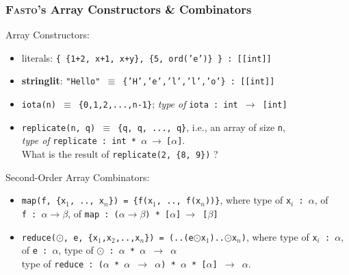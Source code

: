 \documentclass{beamer}
\renewcommand{\emph}[1]{\textcolor{structure}{#1}}
\newcommand{\emp}[1]{\textcolor{DikuRed}{ #1}}
\begin{document}
\begin{frame}[fragile,t]
\frametitle{\textsc{Fasto}'s Array Constructors \& Combinators}

Array Constructors:
\begin{itemize}
    \item literals: \emph{{\tt \{~\{1+2, x+1, x+y\}, \{5, ord('e')\}~\}}}\emp{{\tt~:~[[int]]}}
    \item {\bf stringlit}: \emph{{\tt "Hello"~$\equiv$~\{'H','e','l','l','o'\}}}\emp{{\tt~:~[[int]]}}\pause
    \item {\tt iota(n)~$\equiv$}~\emph{{\tt\{0,1,2,...,n-1\}}}; {\em type of} 
        \emp{{\tt iota~:~int~$\rightarrow$~[int]}}\pause
    \item {\tt replicate(n, q)~$\equiv$}~\emph{{\tt\{q, q, ..., q\}}}, i.e., an array of size {\tt n},\\
          {\em type of} \emp{{\tt{}replicate : int * $\alpha~\rightarrow~$[$\alpha$]}}.\\
        What is the result of {\tt replicate(2, \{8, 9\})} ?
\end{itemize}

\pause
\bigskip

Second-Order Array Combinators:
\begin{itemize}
    \item {\tt map(f, \{x$_1$, .., x$_n$\}) = \emph{\{f(x$_1$, .., f(x$_n$))\}}}, where 
        type of \emp{{\tt{}x$_i$~:~$\alpha$}}, of 
        \emp{{\tt f~:~$\alpha\rightarrow\beta$}}, of
        \emp{{\tt map~:~($\alpha\rightarrow\beta$)~*~[$\alpha$]$~\rightarrow$~[$\beta$]}}
        \pause
    \item {\tt reduce($\odot$,~e,~\{x$_1$,x$_2$,..,x$_n$\})~=~\emph{(..(e$\odot$x$_1$)..$\odot$x$_n$)}}, where 
        type of \emp{{\tt{}x$_i$~:~$\alpha$}}, of \emp{{\tt{}e~:~$\alpha$}}, 
        type of \emp{{\tt{}$\odot$~:~$\alpha$~*~$\alpha$~$\rightarrow$~$\alpha$}}\\
        type of \emp{{\tt reduce~:~($\alpha$~*~$\alpha$~$\rightarrow$~$\alpha$)~*~$\alpha$~*~[$\alpha$]~$\rightarrow$~$\alpha$}}.
\end{itemize}

\end{frame}
\end{document}
